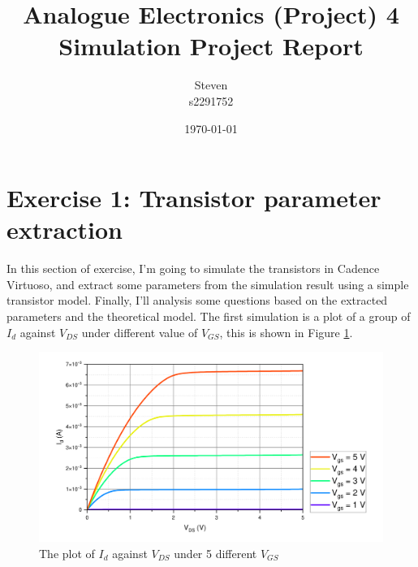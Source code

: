 \documentclass[12pt]{article}   %
\title{Analogue Electronics (Project) 4 Simulation Project Report}
\author{Steven \\ s2291752}
\date{\today}
\begin{document}
	
	\maketitle
	
	\section{Exercise 1: Transistor parameter extraction}
	
	In this section of exercise, I'm going to simulate the transistors in Cadence Virtuoso, and extract some parameters from the simulation result using a simple transistor model. Finally, I'll analysis some questions based on the extracted parameters and the theoretical model. The first simulation is a plot of a group of $I_d$ against $V_{DS}$ under different value of $V_{GS}$, this is shown in Figure \ref{fig:groupIdVds}.

	\begin{figure}[htbp]
		\centering
		\includegraphics[width=0.7\linewidth]{Figures/E1_NMOS_Characteristic/Group_Id_VDS}
		\caption{The plot of $I_d$ against $V_{DS}$ under 5 different $V_{GS}$}
		\label{fig:groupIdVds}
	\end{figure}
	
\end{document}
